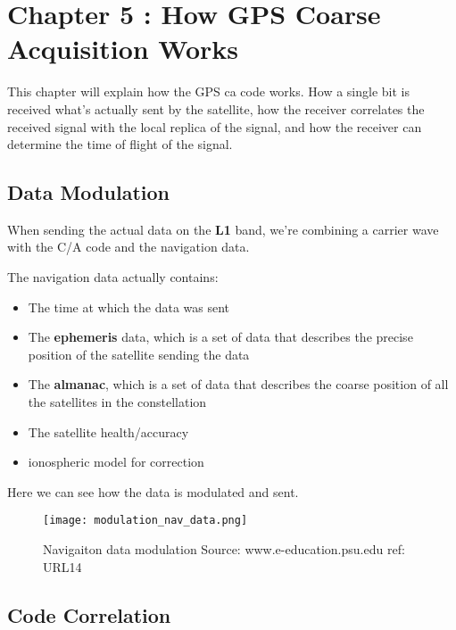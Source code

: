 \chapter{Chapter 5 : How GPS Coarse Acquisition Works}

This chapter will explain how the GPS \gls{ca} code works. How a single bit is received what's actually sent by the satellite, how the receiver correlates the received signal with the local replica of the signal, and how the receiver can determine the time of flight of the signal.


\section{Data Modulation}

When sending the actual data on the \textbf{L1} band, we're combining a carrier wave with the C/A code and the navigation data.

The navigation data actually contains:
\begin{itemize}
	\item The time at which the data was sent
	\item The \textbf{ephemeris} data, which is a set of data that describes the precise position of the satellite sending the data
	\item The \textbf{almanac}, which is a set of data that describes the coarse position of all the satellites in the constellation
	\item The satellite health/accuracy
	\item ionospheric model for correction
\end{itemize}

Here we can see how the data is modulated and sent.

\begin{figure}[H]
	\centering
	\texttt{[image: modulation\_nav\_data.png]}
	\caption[Navigaiton data modulation]{Navigaiton data modulation Source: www.e-education.psu.edu ref: URL14}
	\label{fig:nav_modulation}
\end{figure}



\section{Code Correlation}

